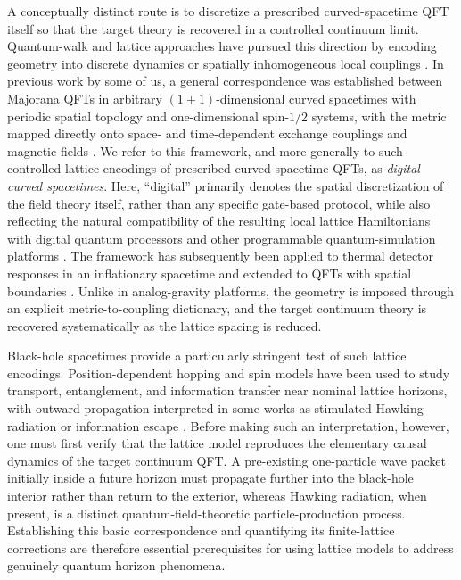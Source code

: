 \documentclass[reprint,amsmath,amssymb,aps,showkeys,superscriptaddress]{revtex4-2}
\begin{document}
A conceptually distinct route is to discretize a prescribed curved-spacetime QFT itself so that the target theory is recovered in a controlled continuum limit. Quantum-walk and lattice approaches have pursued this direction by encoding geometry into discrete dynamics or spatially inhomogeneous local couplings \cite{DiMolfetta2013,Yang2020,LewisVidal2020}. In previous work by some of us, a general correspondence was established between Majorana QFTs in arbitrary $(1+1)$-dimensional curved spacetimes with periodic spatial topology and one-dimensional spin-$1/2$ systems, with the metric mapped directly onto space- and time-dependent exchange couplings and magnetic fields \cite{Kinoshita2025}. We refer to this framework, and more generally to such controlled lattice encodings of prescribed curved-spacetime QFTs, as \emph{digital curved spacetimes}. Here, ``digital'' primarily denotes the spatial discretization of the field theory itself, rather than any specific gate-based protocol, while also reflecting the natural compatibility of the resulting local lattice Hamiltonians with digital quantum processors and other programmable quantum-simulation platforms \cite{Altman2021}. The framework has subsequently been applied to thermal detector responses in an inflationary spacetime and extended to QFTs with spatial boundaries \cite{KinoshitaInflation2025,KinoshitaBoundary2026}. Unlike in analog-gravity platforms, the geometry is imposed through an explicit metric-to-coupling dictionary, and the target continuum theory is recovered systematically as the lattice spacing is reduced.

Black-hole spacetimes provide a particularly stringent test of such lattice encodings. Position-dependent hopping and spin models have been used to study transport, entanglement, and information transfer near nominal lattice horizons, with outward propagation interpreted in some works as stimulated Hawking radiation or information escape \cite{Yang2020,Shi2023,Benhemou2023,Liu2026}. Before making such an interpretation, however, one must first verify that the lattice model reproduces the elementary causal dynamics of the target continuum QFT. A pre-existing one-particle wave packet initially inside a future horizon must propagate further into the black-hole interior rather than return to the exterior, whereas Hawking radiation, when present, is a distinct quantum-field-theoretic particle-production process. Establishing this basic correspondence and quantifying its finite-lattice corrections are therefore essential prerequisites for using lattice models to address genuinely quantum horizon phenomena.
\end{document}
